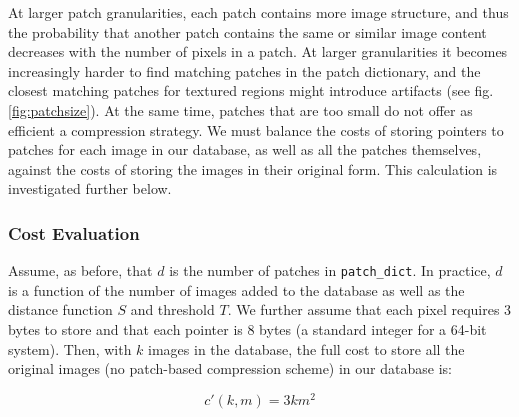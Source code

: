 

At larger patch granularities, each patch contains more image structure, and thus the probability that another patch contains the same or similar image content decreases with the number of pixels in a patch. At larger granularities it becomes increasingly harder to find matching patches in the patch dictionary, and the closest matching patches for textured regions might introduce artifacts (see fig.\ref{fig:patchsize}). At the same time, patches that are too small do not offer as efficient a compression strategy. We must balance the costs of storing pointers to patches for each image in our database, as well as all the patches themselves, against the costs of storing the images in their original form. This calculation is investigated further below.


\subsubsection{Cost Evaluation}
\label{sec:costeval}

Assume, as before, that $d$ is the number of patches in \texttt{patch\_dict}.  In practice, $d$ is a function of the number of images added to the database as well as the distance function $S$ and threshold $T$.  We further assume that each pixel requires 3 bytes to store and that each pointer is 8 bytes (a standard integer for a 64-bit system).  Then, with $k$ images in the database, the full cost to store all the original images (no patch-based compression scheme) in our database is:

\begin{equation}
	 c'(k, m) = 3  k  m^2
\end{equation}

